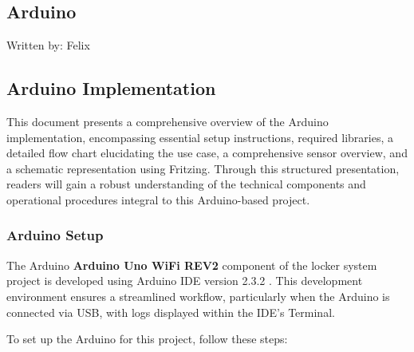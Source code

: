 \subsection{Arduino}
{\tiny Written by: Felix}

\subsection{Arduino Implementation}

This document presents a comprehensive overview of the Arduino implementation, encompassing essential setup instructions, required libraries, a detailed flow chart elucidating the use case, a comprehensive sensor overview, and a schematic representation using Fritzing. Through this structured presentation, readers will gain a robust understanding of the technical components and operational procedures integral to this Arduino-based project.

\subsubsection{Arduino Setup}

The Arduino \textbf{Arduino Uno WiFi REV2} \cite{arduino_uno_wifi_rev2} component of the locker system project is developed using Arduino IDE version 2.3.2 \cite{arduino-software}. This development environment ensures a streamlined workflow, particularly when the Arduino is connected via USB, with logs displayed within the IDE's Terminal.

To set up the Arduino for this project, follow these steps:

